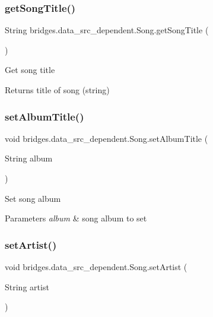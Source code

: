 \subsubsection{\texorpdfstring{get\+Song\+Title()}{getSongTitle()}}
{\footnotesize\ttfamily String bridges.\+data\+\_\+src\+\_\+dependent.\+Song.\+get\+Song\+Title (\begin{DoxyParamCaption}{ }\end{DoxyParamCaption})}

Get song title \begin{DoxyReturn}{Returns}
title of song (string) 
\end{DoxyReturn}
\mbox{\label{classbridges_1_1data__src__dependent_1_1_song_ab9f9d24be49c3a0a66c9ff9e271b007e}} 
\subsubsection{\texorpdfstring{set\+Album\+Title()}{setAlbumTitle()}}
{\footnotesize\ttfamily void bridges.\+data\+\_\+src\+\_\+dependent.\+Song.\+set\+Album\+Title (\begin{DoxyParamCaption}\item[{String}]{album }\end{DoxyParamCaption})}

Set song album 
\begin{DoxyParams}{Parameters}
{\em album} & song album to set \\
\hline
\end{DoxyParams}
\mbox{\label{classbridges_1_1data__src__dependent_1_1_song_adffaec742bf945ec8c81244fdafd47d2}} 
\subsubsection{\texorpdfstring{set\+Artist()}{setArtist()}}
{\footnotesize\ttfamily void bridges.\+data\+\_\+src\+\_\+dependent.\+Song.\+set\+Artist (\begin{DoxyParamCaption}\item[{String}]{artist }\end{DoxyParamCaption})}

